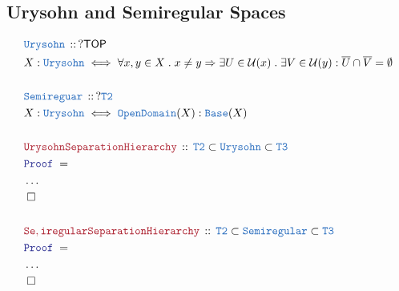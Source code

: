 \documentclass[12pt]{scrartcl}
\newcommand{\TYPE}[1]{\textcolor{NavyBlue}{\mathtt{#1}}}
\newcommand{\LOGIC}[1]{\textcolor{Blue}{\mathtt{#1}}}
\newcommand{\THM}[1]{\textcolor{Maroon}{\mathtt{#1}}}
\renewcommand{\.}{\; . \;}
\newcommand{\Theorem}[2]{& \THM{#1} \, :: \, #2 \\ & \Proof = \\ }
\newcommand{\DeclareType}[2]{& \TYPE{#1} \, :: \, #2 \\}
\newcommand{\DefineType}[3]{& #1 : \TYPE{#2} \iff #3 \\}
\newcommand{\Page}[1]{ \begin{align*} #1 \end{align*}   }
\newcommand{\NoProof}{ & \ldots \\ \EndProof}
\newcommand{\Imply}{\Rightarrow}
\newcommand{\QED}{\; \square}
\newcommand{\EndProof}{& \QED \\}
\newcommand{\Proof}{\LOGIC{Proof} \; }
\newcommand{\TOP}{\mathsf{TOP}}
\newcommand{\U}{\mathcal{U}}
\begin{document}
\subsection{Urysohn and Semiregular Spaces}
\Page{
	\DeclareType{Urysohn}{?\TOP}
	\DefineType{X}{Urysohn}
	{
		\forall x,y \in X \. 
		x \neq y \Imply 
		\exists U \in \U(x) \. 
		\exists V \in \U(y) :
		\overline{U} \cap \overline{V} = \emptyset
	}
	\\
	\DeclareType{Semireguar}{?\TYPE{T2}}
	\DefineType{X}{Urysohn}
	{
		\TYPE{OpenDomain}(X) : \TYPE{Base}(X)
	}
	\\
	\Theorem{UrysohnSeparationHierarchy}
	{
		\TYPE{T2} \subset \TYPE{Urysohn} \subset \TYPE{T3}
	}
	\NoProof
	\\
	\Theorem{Se,iregularSeparationHierarchy}
	{
		\TYPE{T2} \subset \TYPE{Semiregular} \subset \TYPE{T3}
	}
	\NoProof
}
\newpage
\end{document}
